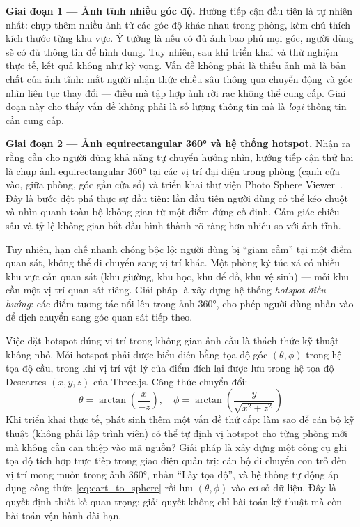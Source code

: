 \documentclass[../DoAn.tex]{subfiles}
\begin{document}
\textbf{Giai đoạn 1 --- Ảnh tĩnh nhiều góc độ.}
Hướng tiếp cận đầu tiên là tự nhiên nhất: chụp thêm nhiều ảnh từ các góc độ
khác nhau trong phòng, kèm chú thích kích thước từng khu vực. Ý tưởng là nếu
có đủ ảnh bao phủ mọi góc, người dùng sẽ có đủ thông tin để hình dung. Tuy
nhiên, sau khi triển khai và thử nghiệm thực tế, kết quả không như kỳ vọng.
Vấn đề không phải là thiếu ảnh mà là bản chất của ảnh tĩnh: mắt người nhận
thức chiều sâu thông qua chuyển động và góc nhìn liên tục thay đổi --- điều
mà tập hợp ảnh rời rạc không thể cung cấp. Giai đoạn này cho thấy vấn đề
không phải là số lượng thông tin mà là \textit{loại} thông tin cần cung cấp.

\textbf{Giai đoạn 2 --- Ảnh equirectangular 360° và hệ thống hotspot.}
Nhận ra rằng cần cho người dùng khả năng tự chuyển hướng nhìn, hướng tiếp cận
thứ hai là chụp ảnh equirectangular 360° tại các vị trí đại diện trong phòng
(cạnh cửa vào, giữa phòng, góc gần cửa sổ) và triển khai thư viện Photo Sphere
Viewer~\cite{psv2023}. Đây là bước đột phá thực sự đầu tiên: lần đầu tiên
người dùng có thể kéo chuột và nhìn quanh toàn bộ không gian từ một điểm đứng
cố định. Cảm giác chiều sâu và tỷ lệ không gian bắt đầu hình thành rõ ràng
hơn nhiều so với ảnh tĩnh.

Tuy nhiên, hạn chế nhanh chóng bộc lộ: người dùng bị ``giam cầm'' tại một
điểm quan sát, không thể di chuyển sang vị trí khác. Một phòng ký túc xá có
nhiều khu vực cần quan sát (khu giường, khu học, khu để đồ, khu vệ sinh) ---
mỗi khu cần một vị trí quan sát riêng. Giải pháp là xây dựng hệ thống
\textit{hotspot điều hướng}: các điểm tương tác nổi lên trong ảnh 360°, cho
phép người dùng nhấn vào để dịch chuyển sang góc quan sát tiếp theo.

Việc đặt hotspot đúng vị trí trong không gian ảnh cầu là thách thức kỹ thuật
không nhỏ. Mỗi hotspot phải được biểu diễn bằng tọa độ góc $(\theta, \phi)$
trong hệ tọa độ cầu, trong khi vị trí vật lý của điểm đích lại được lưu trong
hệ tọa độ Descartes $(x, y, z)$ của Three.js. Công thức chuyển đổi:
\begin{equation}
\theta = \arctan\!\left(\frac{x}{-z}\right), \quad
\phi   = \arctan\!\left(\frac{y}{\sqrt{x^2+z^2}}\right)
\label{eq:cart_to_sphere}
\end{equation}
Khi triển khai thực tế, phát sinh thêm một vấn đề thứ cấp: làm sao để cán bộ
kỹ thuật (không phải lập trình viên) có thể tự định vị hotspot cho từng phòng
mới mà không cần can thiệp vào mã nguồn? Giải pháp là xây dựng một công cụ ghi
tọa độ tích hợp trực tiếp trong giao diện quản trị: cán bộ di chuyển con trỏ
đến vị trí mong muốn trong ảnh 360°, nhấn ``Lấy tọa độ'', và hệ thống tự động
áp dụng công thức~\eqref{eq:cart_to_sphere} rồi lưu $(\theta, \phi)$ vào cơ
sở dữ liệu. Đây là quyết định thiết kế quan trọng: giải quyết không chỉ bài
toán kỹ thuật mà còn bài toán vận hành dài hạn.
\end{document}
